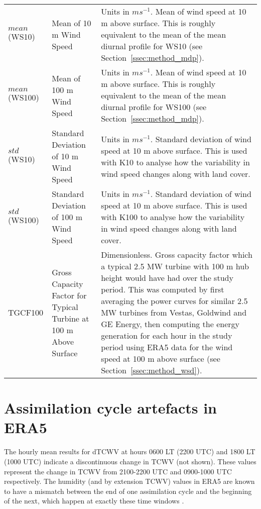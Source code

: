 \begin{landscape}
\begin{longtable}{P{2cm}P{3cm}P{15cm}}
		$mean$(WS10) & Mean of 10 m Wind Speed & Units in $m s^{-1}$. Mean of wind speed at 10 m above surface. This is roughly equivalent to the mean of the mean diurnal profile for WS10 (see Section~\ref{ssec:method_mdp}). \\
		$mean$(WS100) & Mean of 100 m Wind Speed & Units in $m s^{-1}$. Mean of wind speed at 10 m above surface. This is roughly equivalent to the mean of the mean diurnal profile for WS100 (see Section~\ref{ssec:method_mdp}). \\
		$std$(WS10) & Standard Deviation of 10 m Wind Speed & Units in $m s^{-1}$. Standard deviation of wind speed at 10 m above surface. This is used with K10 to analyse how the variability in wind speed changes along with land cover. \\
		$std$(WS100) & Standard Deviation of 100 m Wind Speed & Units in $m s^{-1}$. Standard deviation of wind speed at 10 m above surface. This is used with K100 to analyse how the variability in wind speed changes along with land cover. \\
		TGCF100 & Gross Capacity Factor for Typical Turbine at 100 m Above Surface & Dimensionless. Gross capacity factor which a typical 2.5 MW turbine with 100 m hub height would have had over the study period. This was computed by first averaging the power curves for similar 2.5 MW turbines from Vestas, Goldwind and GE Energy, then computing the energy generation for each hour in the study period using ERA5 data for the wind speed at 100 m above surface (see Section~\ref{ssec:method_wsd}). \\ \bottomrule
	\end{longtable}
	
	\endgroup
\end{landscape}

\section{Assimilation cycle artefacts in ERA5}
\label{sec:artefact}

The hourly mean results for \ac{dTCWV} at hours 0600 \ac{LT} (2200 UTC) and 1800 \ac{LT} (1000 UTC) indicate a discontinuous change in \ac{TCWV} (not shown). These values represent the change in \ac{TCWV} from 2100-2200 UTC and 0900-1000 UTC respectively. The humidity (and by extension \ac{TCWV}) values in ERA5 are known to have a mismatch between the end of one assimilation cycle and the beginning of the next, which happen at exactly these time windows \citep{ecmwf}.

